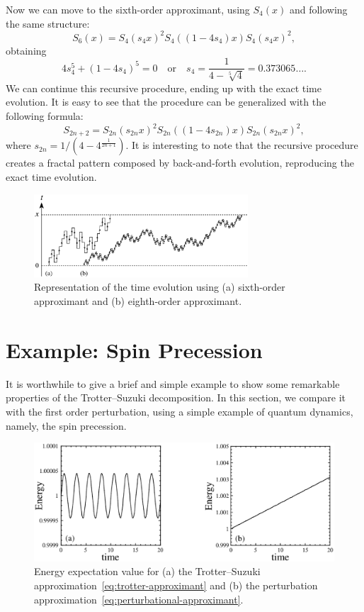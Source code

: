 Now we can move to the sixth-order approximant, using $S_4(x)$ and following the same structure:
\begin{equation} \label{eq:sixth-order}
S_6(x) = S_4(s_4x)^2 S_4((1-4s_4)x) S_4(s_4x)^2,
\end{equation}
obtaining
\begin{equation}
4s_4^5 + (1-4s_4)^5 = 0 \quad \mathrm{or} \quad s_4 = \frac{1}{4-\sqrt[5]{4}} = 0.373065\ldots .
\end{equation}
We can continue this recursive procedure, ending up with the exact time evolution. It is easy to see that the procedure can be generalized with the following formula:
\begin{equation}
S_{2n+2} = S_{2n}(s_{2n}x)^2 S_{2n}((1-4s_{2n})x) S_{2n}(s_{2n}x)^2,
\end{equation}
where $s_{2n} = 1/(4-4^{\frac{1}{2n+1}})$.
It is interesting to note that the recursive procedure creates a fractal pattern composed by back-and-forth evolution, reproducing the exact time evolution.
\begin{figure}
  \centering
   \includegraphics[width=8cm]{Plots/fractal_evolution.eps}
   \caption{Representation of the time evolution using (a) sixth-order approximant and (b) eighth-order approximant.} \label{plot:fractal-evolution}
\end{figure}

\section{Example: Spin Precession}
It is worthwhile to give a brief and simple example to show some remarkable properties of the Trotter--Suzuki decomposition. In this section, we compare it with the first order perturbation, using a simple example of quantum dynamics, namely, the spin precession.

\begin{figure}[t]
  \centering
   \includegraphics[width=12cm]{Plots/spin_evolution.eps}
   \caption{Energy expectation value for (a) the Trotter--Suzuki approximation~\eqref{eq:trotter-approximant} and (b) the perturbation approximation~\eqref{eq:perturbational-approximant}.} \label{plot:spin-evolution}
\end{figure}

